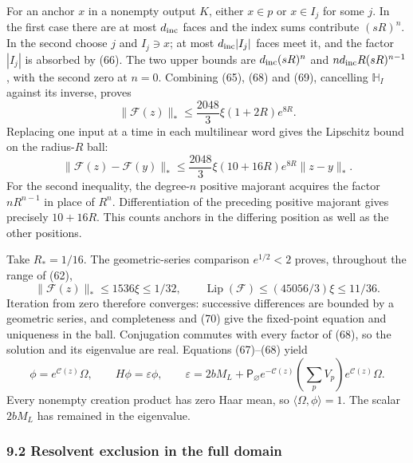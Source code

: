 \documentclass[
  11pt,
]{article}
\begin{document}
For an anchor \(x\) in a nonempty output \(K\), either \(x\in p\) or
\(x\in I_j\) for some \(j\). In the first case there are at most
\(d_{\rm inc}\) faces and the index sums contribute \((sR)^n\). In the
second choose \(j\) and \(I_j\ni x\); at most \(d_{\rm inc}|I_j|\) faces
meet it, and the factor \(|I_j|\) is absorbed by (66). The two upper
bounds are \(d_{\rm inc}(sR)^n\) and \(nd_{\rm inc}R(sR)^{n-1}\), with
the second zero at \(n=0\). Combining (65), (68) and (69), cancelling
\(\mathbb H_I\) against its inverse, proves \[
 \|\mathcal F(z)\|_*
 \le\frac{2048}{3}\xi(1+2R)e^{8R}.
\] Replacing one input at a time in each multilinear word gives the
Lipschitz bound on the radius-\(R\) ball: \[
 \|\mathcal F(z)-\mathcal F(y)\|_*
 \le\frac{2048}{3}\xi(10+16R)e^{8R}\|z-y\|_* .
 \tag{70}
\] For the second inequality, the degree-\(n\) positive majorant
acquires the factor \(nR^{n-1}\) in place of \(R^n\). Differentiation of
the preceding positive majorant gives precisely \(10+16R\). This counts
anchors in the differing position as well as the other positions.

Take \(R_*=1/16\). The geometric-series comparison \(e^{1/2}<2\) proves,
throughout the range of (62), \[
 \|\mathcal F(z)\|_*\le1536\xi\le1/32,\qquad
 \operatorname{Lip}(\mathcal F)\le(45056/3)\xi\le11/36.
 \tag{71}
\] Iteration from zero therefore converges: successive differences are
bounded by a geometric series, and completeness and (70) give the
fixed-point equation and uniqueness in the ball. Conjugation commutes
with every factor of (68), so the solution and its eigenvalue are real.
Equations (67)--(68) yield \[
 \phi=e^{\mathscr C(z)}\Omega,\qquad H\phi=\varepsilon\phi,\qquad
 \varepsilon=2bM_L+
 \mathsf P_\varnothing e^{-\mathscr C(z)}
       \left(\sum_pV_p\right)e^{\mathscr C(z)}\Omega .
 \tag{72}
\] Every nonempty creation product has zero Haar mean, so
\(\langle\Omega,\phi\rangle=1\). The scalar \(2bM_L\) has remained in
the eigenvalue.

\subsubsection{9.2 Resolvent exclusion in the full
domain}\label{resolvent-exclusion-in-the-full-domain}
\end{document}
